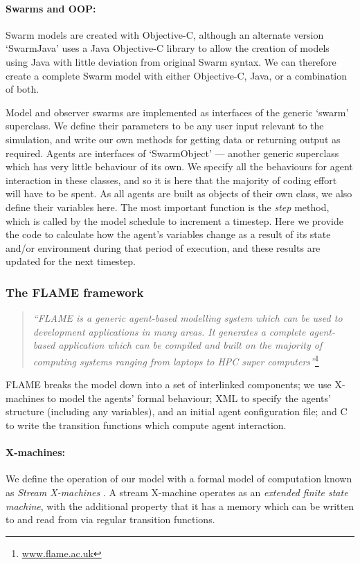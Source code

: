 \documentclass[11pt,a4paper]{article}
\begin{document}
\paragraph{Swarms and OOP:}
Swarm models are created with Objective-C, although an alternate version `SwarmJava' uses a Java Objective-C library to allow the creation of models using Java with little deviation from original Swarm syntax. We can therefore create a complete Swarm model with either Objective-C, Java, or a combination of both.

Model and observer swarms are implemented as interfaces of the generic `swarm' superclass. We define their parameters to be any user input relevant to the simulation, and write our own methods for getting data or returning output as required.
Agents are interfaces of `SwarmObject' --- another generic superclass which has very little behaviour of its own. We specify all the behaviours for agent interaction in these classes, and so it is here that the majority of coding effort will have to be spent. As all agents are built as objects of their own class, we also define their variables here. The most important function is the \emph{step} method, which is called by the model schedule to increment a timestep. Here we provide the code to calculate how the agent's variables change as a result of its state and/or environment during that period of execution, and these results are updated for the next timestep.

\subsubsection{The FLAME framework}
\label{flame}
\begin{quotation}
\noindent\emph{``FLAME is a generic agent-based modelling system which can be used to development applications in many areas. It generates a complete agent-based application which can be compiled and built on the majority of computing systems ranging from laptops to HPC super computers''}\footnote{\url{www.flame.ac.uk}}
\end{quotation}

\noindent FLAME breaks the model down into a set of interlinked components; we use X-machines to model the agents' formal behaviour; XML to specify the agents' structure (including any variables), and an initial agent configuration file; and C to write the transition functions which compute agent interaction.

\paragraph{X-machines:}
We define the operation of our model with a formal model of computation known as \emph{Stream X-machines} \cite{streamX}. A stream X-machine operates as an \emph{extended finite state machine}, with the additional property that it has a memory which can be written to and read from via regular transition functions.
\end{document}
